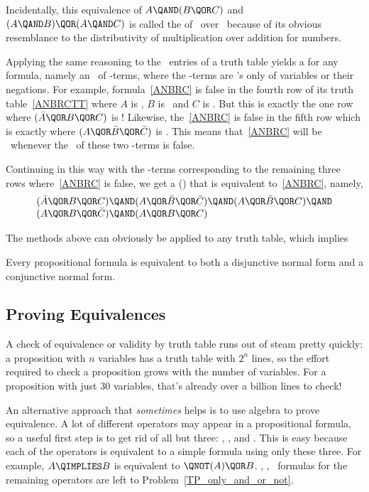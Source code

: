 Incidentally, this equivalence of $A \QAND (B \QOR C)$ and $(A \QAND
B) \QOR (A \QAND C)$ is called the  of
\QAND\ over \QOR\ because of its obvious resemblance to the
distributivity of multiplication over addition for numbers.

Applying the same reasoning to the \false\ entries of a truth table
yields a  for any formula, namely an \QAND\
of \QOR-terms, where the \QOR-terms are \QOR's only of variables or
their negations.  For example, formula~\eqref{ANBRC} is false in the
fourth row of its truth table~\eqref{ANBRCTT} where $A$ is \true, $B$
is \false\ and $C$ is \false.  But this is exactly the one row where
$(\bar{A} \QOR B \QOR C)$ is \false!  Likewise, the~\eqref{ANBRC} is
false in the fifth row which is exactly where
$(A \QOR \bar{B} \QOR \bar{C})$ is \false.  This means
that~\eqref{ANBRC} will be \false\ whenever the \QAND\ of these
two \QOR-terms is false.  
\iffalse
$(\bar{A} \QOR B \QOR C) \QAND (A \QOR \bar{B} \QOR \bar{C})$ is \false.
\fi
Continuing in this way with the \QOR-terms corresponding to the
remaining three rows where~\eqref{ANBRC} is false, we get a
 () that is equivalent to~\eqref{ANBRC}, namely,
\[\begin{array}{l}
(\bar{A} \QOR B \QOR C)  \QAND (A \QOR \bar{B} \QOR \bar{C}) 
        \QAND (A \QOR \bar{B} \QOR C)  \QAND \\
(A \QOR B \QOR \bar{C}) \QAND (A \QOR B \QOR C)
\end{array}\]

The methods above can obviously be applied to any truth table, which implies
\begin{theorem}
Every propositional formula is equivalent to both a disjunctive normal
form and a conjunctive normal form.
\end{theorem}

\subsection{Proving Equivalences}\label{propositional_equivalences_sec}
A check of equivalence or validity by truth table runs out of steam
pretty quickly: a proposition with $n$ variables has a truth table
with $2^n$ lines, so the effort required to check a proposition
grows  with the number of variables.  For a
proposition with just 30 variables, that's already over a billion
lines to check!

An alternative approach that \emph{sometimes} helps is to use algebra
to prove equivalence.  A lot of different operators may appear in a
propositional formula, so a useful first step is to get rid of all but
three: \QAND, \QOR, and \QNOT.  This is easy because each of the
operators is equivalent to a simple formula using only these three.
For example, $A \QIMPLIES B$ is equivalent to $\QNOT(A) \QOR
B$.  \QAND, \QOR, \QNOT\ formulas for the remaining operators are left
to Problem~\ref{TP_only_and_or_not}.


